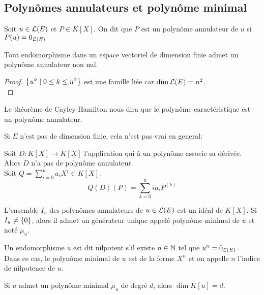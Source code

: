 \subsection{Polynômes annulateurs et polynôme minimal}


\begin{definition}
	Soit $u \in \mathcal{L}(E)$ et $P \in K[X]$. On dit que $P$ est un polynôme annulateur de $u$ si $P(u) = 0_{\mathcal{L}(E)}$
\end{definition}


\begin{prop}
	Tout endomorphisme dans un espace vectoriel de dimension finie admet un polynôme annulateur non nul.
\end{prop}


\begin{proof}
	$\left\{u^k \mid 0 \leq k \leq n^2\right\}$ est une famille liée car $\dim \mathcal{L}(E) = n^2$.\\
\end{proof}


\begin{remarque}
	Le théorème de Cayley-Hamilton nous dira que le polynôme caractéristique est un polynôme annulateur.
\end{remarque}

\begin{remarque}
	Si $E$ n'est pas de dimension finie, cela n'est pas vrai en general:

	Soit $D : K[X] \to K[X]$ l'application qui à un polynôme associe sa dérivée. Alors $D$ n'a pas de polynôme annulateur.\\
	Soit $Q = \sum\limits_{i=0}^n a_iX^i \in K[X]$.
	$$Q(D)(P) = \sum\limits_{k=0}^n ia_i P^{(k)}$$
\end{remarque}



\begin{prop}
	L'ensemble $I_u$ des polynômes annulateurs de $u \in \mathcal{L}(E)$ est un idéal de $K[X]$.
	Si $I_u \neq \left\{0\right\}$, alors il admet un générateur unique appelé polynôme minimal de $u$ et noté $\mu_u$.
\end{prop}


\begin{definition}
	Un endomorphisme $u$ est dit nilpotent s'il existe $n \in \mathbb{N}$ tel que $u^n = 0_{\mathcal{L}(E)}$.\\
	Dans ce cas, le polynôme minimal de $u$ est de la forme $X^n$ et on appelle $n$ l'indice de nilpotence de $u$.
\end{definition}

\begin{remarque}
	Si $u$ admet un polynôme minimal $\mu_u$ de degré $d$, alors $\dim K[u] = d$.
\end{remarque}

